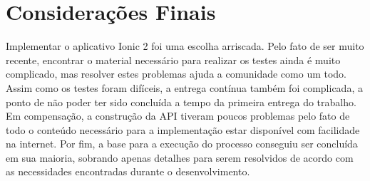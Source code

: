 \section{Considerações Finais}
Implementar o aplicativo Ionic 2 foi uma escolha arriscada. Pelo fato de ser muito recente, encontrar o material necessário para realizar os testes ainda é muito complicado, mas resolver estes problemas ajuda a comunidade como um todo. Assim como os testes foram difíceis, a entrega contínua também foi complicada, a ponto de não poder ter sido concluída a tempo da primeira entrega do trabalho. Em compensação, a construção da API tiveram poucos problemas pelo fato de todo o conteúdo necessário para a implementação estar disponível com facilidade na internet. Por fim, a base para a execução do processo conseguiu ser concluída em sua maioria, sobrando apenas detalhes para serem resolvidos de acordo com as necessidades encontradas durante o desenvolvimento.
